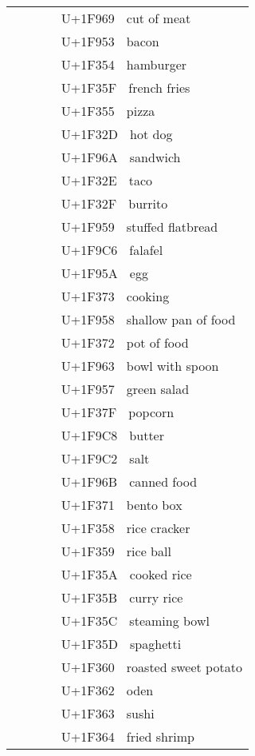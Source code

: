 \documentclass[a4paper,12pt]{article}
\newcommand{\fontA}[1]{{\fontspec[RawFeature={mode=harf,+dist,+ccmp}]{Segoe UI Emoji} #1}}
\newcommand{\fontB}[1]{{\fontspec[RawFeature={mode=harf,+dist,+ccmp}]{Noto Color Emoji} #1}}
\begin{document}
\begin{longtable}[c]{ccp{0.8\linewidth}}
\fontA{🥩}&\fontB{🥩}&U+1F969 🥩 cut of meat\\
\fontA{🥓}&\fontB{🥓}&U+1F953 🥓 bacon\\
\fontA{🍔}&\fontB{🍔}&U+1F354 🍔 hamburger\\
\fontA{🍟}&\fontB{🍟}&U+1F35F 🍟 french fries\\
\fontA{🍕}&\fontB{🍕}&U+1F355 🍕 pizza\\
\fontA{🌭}&\fontB{🌭}&U+1F32D 🌭 hot dog\\
\fontA{🥪}&\fontB{🥪}&U+1F96A 🥪 sandwich\\
\fontA{🌮}&\fontB{🌮}&U+1F32E 🌮 taco\\
\fontA{🌯}&\fontB{🌯}&U+1F32F 🌯 burrito\\
\fontA{🥙}&\fontB{🥙}&U+1F959 🥙 stuffed flatbread\\
\fontA{🧆}&\fontB{🧆}&U+1F9C6 🧆 falafel\\
\fontA{🥚}&\fontB{🥚}&U+1F95A 🥚 egg\\
\fontA{🍳}&\fontB{🍳}&U+1F373 🍳 cooking\\
\fontA{🥘}&\fontB{🥘}&U+1F958 🥘 shallow pan of food\\
\fontA{🍲}&\fontB{🍲}&U+1F372 🍲 pot of food\\
\fontA{🥣}&\fontB{🥣}&U+1F963 🥣 bowl with spoon\\
\fontA{🥗}&\fontB{🥗}&U+1F957 🥗 green salad\\
\fontA{🍿}&\fontB{🍿}&U+1F37F 🍿 popcorn\\
\fontA{🧈}&\fontB{🧈}&U+1F9C8 🧈 butter\\
\fontA{🧂}&\fontB{🧂}&U+1F9C2 🧂 salt\\
\fontA{🥫}&\fontB{🥫}&U+1F96B 🥫 canned food\\
\fontA{🍱}&\fontB{🍱}&U+1F371 🍱 bento box\\
\fontA{🍘}&\fontB{🍘}&U+1F358 🍘 rice cracker\\
\fontA{🍙}&\fontB{🍙}&U+1F359 🍙 rice ball\\
\fontA{🍚}&\fontB{🍚}&U+1F35A 🍚 cooked rice\\
\fontA{🍛}&\fontB{🍛}&U+1F35B 🍛 curry rice\\
\fontA{🍜}&\fontB{🍜}&U+1F35C 🍜 steaming bowl\\
\fontA{🍝}&\fontB{🍝}&U+1F35D 🍝 spaghetti\\
\fontA{🍠}&\fontB{🍠}&U+1F360 🍠 roasted sweet potato\\
\fontA{🍢}&\fontB{🍢}&U+1F362 🍢 oden\\
\fontA{🍣}&\fontB{🍣}&U+1F363 🍣 sushi\\
\fontA{🍤}&\fontB{🍤}&U+1F364 🍤 fried shrimp\\

\end{longtable}
\end{document}
